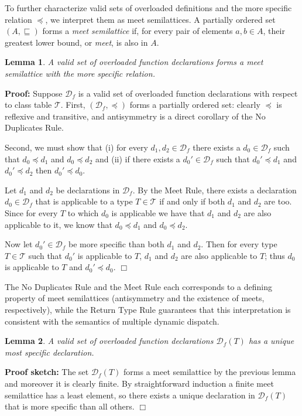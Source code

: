 \documentclass[10pt]{sigplanconf}
\newcommand{\ms}{\preceq}
\newcommand{\T}{\ensuremath{\mathcal{T}}}
\newcommand{\D}{\ensuremath{\mathcal{D}}}
\newcommand{\Df}[1][f]{\D_{\!#1}}
\newtheorem{lemma}{Lemma}
\newenvironment{proof}{\noindent \textbf{Proof:} }{\hfill $\Box$}
\newenvironment{psketch}{\noindent \textbf{Proof sketch:} }{\hfill $\Box$}
\begin{document}
To further characterize valid sets of overloaded definitions and the
more specific relation $\ms$, we interpret them as
meet semilattices. A partially ordered set $(A, \sqsubseteq)$ forms a
\emph{meet semilattice} if, for every pair of elements $a,b \in A$, their
greatest lower bound, or \emph{meet}, is also in $A$.
\begin{lemma}
\label{lem:meetsemilattice}
A valid set of overloaded function declarations forms a meet semilattice with
the more specific relation.
\end{lemma}
\begin{proof}
Suppose $\Df$ is a valid set of overloaded function declarations
with respect to class table $\T$.
First, $(\Df, \ms)$ forms a partially ordered set: clearly $\ms$ is
reflexive and transitive, and antisymmetry is a direct corollary of the
No Duplicates Rule.

Second, we must
show that (i) for every $d_1, d_2 \in \Df$ there exists a $d_0 \in \Df$
such that $d_0 \ms d_1$ and $d_0 \ms d_2$ and (ii) if there exists a
$d_0' \in \Df$ such that $d_0' \ms d_1$ and $d_0' \ms d_2$ then
$d_0' \ms d_0$.

Let $d_1$ and $d_2$ be declarations in $\Df$. By the Meet Rule, there
exists a declaration $d_0 \in \Df$ that is applicable to a type $T \in \T$
if and only if both $d_1$ and $d_2$ are too. Since for every $T$ to which
$d_0$ is applicable we have that $d_1$ and $d_2$ are also applicable to it,
we know that $d_0 \ms d_1$ and $d_0 \ms d_2$.

Now let $d_0' \in \Df$ be more specific than both $d_1$ and $d_2$.
Then for every type $T \in \T$ such that $d_0'$ is applicable
to $T$, $d_1$ and $d_2$ are also applicable to $T$; thus $d_0$ is
applicable to $T$ and $d_0' \ms d_0$.
\end{proof}

The No Duplicates Rule and the Meet Rule each
corresponds to a defining property of
meet semilattices (antisymmetry and the existence of meets,
respectively), while the Return Type
Rule guarantees that this interpretation is consistent with the
semantics of multiple dynamic dispatch.

\begin{lemma}
\label{lem:leastelement}
A valid set of overloaded function declarations $\Df(T)$ has a unique
most specific declaration.
\end{lemma}
\begin{psketch}
The set $\Df(T)$ forms a meet semilattice by the previous lemma and moreover
it is clearly finite. By straightforward induction a finite meet semilattice
has a least element, so there exists a unique declaration in $\Df(T)$ that
is more specific than all others.
\end{psketch}
\end{document}
